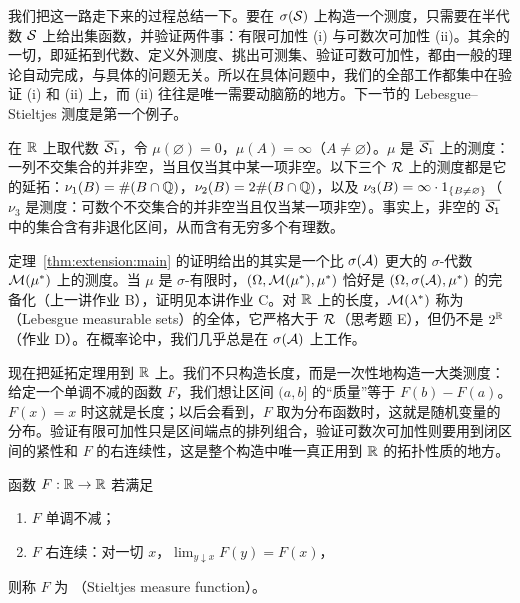 \begin{remark}
我们把这一路走下来的过程总结一下。要在 $\sigma(\mathcal{S})$ 上构造一个测度，只需要在半代数 $\mathcal{S}$ 上给出集函数，并验证两件事：有限可加性 (i) 与可数次可加性 (ii)。其余的一切，即延拓到代数、定义外测度、挑出可测集、验证可数可加性，都由一般的理论自动完成，与具体的问题无关。所以在具体问题中，我们的全部工作都集中在验证 (i) 和 (ii) 上，而 (ii) 往往是唯一需要动脑筋的地方。下一节的 Lebesgue--Stieltjes 测度是第一个例子。
\end{remark}

\begin{example}
在 $\mathbb{R}$ 上取代数 $\overline{\mathcal{S}_1}$，令 $\mu(\varnothing)=0$，$\mu(A)=\infty$（$A\neq\varnothing$）。$\mu$ 是 $\overline{\mathcal{S}_1}$ 上的测度：一列不交集合的并非空，当且仅当其中某一项非空。以下三个 $\mathcal{R}$ 上的测度都是它的延拓：$\nu_1(B)=\#(B\cap\mathbb{Q})$，$\nu_2(B)=2\#(B\cap\mathbb{Q})$，以及 $\nu_3(B)=\infty\cdot1_{\{B\neq\varnothing\}}$（$\nu_3$ 是测度：可数个不交集合的并非空当且仅当某一项非空）。事实上，非空的 $\overline{\mathcal{S}_1}$ 中的集合含有非退化区间，从而含有无穷多个有理数。
\end{example}

\begin{remark}
定理~\ref{thm:extension:main} 的证明给出的其实是一个比 $\sigma(\mathcal{A})$ 更大的 $\sigma$-代数 $\mathcal{M}(\mu^*)$ 上的测度。当 $\mu$ 是 $\sigma$-有限时，$(\Omega,\mathcal{M}(\mu^*),\mu^*)$ 恰好是 $(\Omega,\sigma(\mathcal{A}),\mu^*)$ 的完备化（上一讲作业 B），证明见本讲作业 C。对 $\mathbb{R}$ 上的长度，$\mathcal{M}(\lambda^*)$ 称为 （Lebesgue measurable sets）的全体，它严格大于 $\mathcal{R}$（思考题 E），但仍不是 $2^{\mathbb{R}}$（作业 D）。在概率论中，我们几乎总是在 $\sigma(\mathcal{A})$ 上工作。
\end{remark}


现在把延拓定理用到 $\mathbb{R}$ 上。我们不只构造长度，而是一次性地构造一大类测度：给定一个单调不减的函数 $F$，我们想让区间 $(a,b]$ 的“质量”等于 $F(b)-F(a)$。$F(x)=x$ 时这就是长度；以后会看到，$F$ 取为分布函数时，这就是随机变量的分布。验证有限可加性只是区间端点的排列组合，验证可数次可加性则要用到闭区间的紧性和 $F$ 的右连续性，这是整个构造中唯一真正用到 $\mathbb{R}$ 的拓扑性质的地方。

\begin{definition}\label{def:extension:stieltjes}
函数 $F:\mathbb{R}\to\mathbb{R}$ 若满足
\begin{enumerate}
\item $F$ 单调不减；
\item $F$ 右连续：对一切 $x$，$\lim_{y\downarrow x}F(y)=F(x)$，
\end{enumerate}
则称 $F$ 为 （Stieltjes measure function）。
\end{definition}

